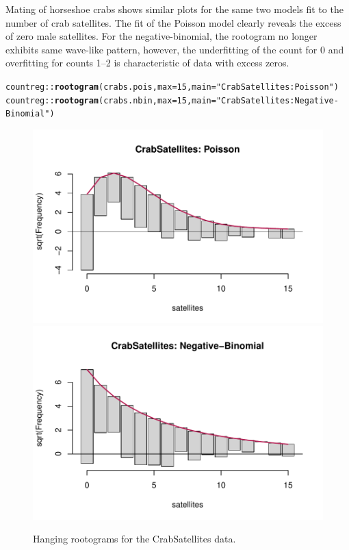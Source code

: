 \documentclass[11pt]{book}\usepackage[]{graphicx}\usepackage[]{color}
\makeatletter
\newcommand{\hlnum}[1]{\textcolor[rgb]{0.686,0.059,0.569}{#1}}%
\newcommand{\hlstr}[1]{\textcolor[rgb]{0.192,0.494,0.8}{#1}}%
\newcommand{\hlstd}[1]{\textcolor[rgb]{0.345,0.345,0.345}{#1}}%
\newcommand{\hlkwc}[1]{\textcolor[rgb]{0.333,0.667,0.333}{#1}}%
\newcommand{\hlkwd}[1]{\textcolor[rgb]{0.737,0.353,0.396}{\textbf{#1}}}%
\newenvironment{kframe}{%
 \def\at@end@of@kframe{}%
 \ifinner\ifhmode%
  \def\at@end@of@kframe{\end{minipage}}%
  \begin{minipage}{\columnwidth}%
 \fi\fi%
 \def\FrameCommand##1{\hskip\@totalleftmargin \hskip-\fboxsep
 \colorbox{shadecolor}{##1}\hskip-\fboxsep
     \hskip-\linewidth \hskip-\@totalleftmargin \hskip\columnwidth}%
 \MakeFramed {\advance\hsize-\width
   \@totalleftmargin\z@ \linewidth\hsize
   \@setminipage}}%
 {\par\unskip\endMakeFramed%
 \at@end@of@kframe}
\newenvironment{knitrout}{}{} %
\renewenvironment{knitrout}{\small\renewcommand{\baselinestretch}{.85}}{} %
\makeatother
\begin{document}
\begin{Example}[crabs2]{Mating of horseshoe crabs}
 shows similar plots for the same two models fit to the number of
crab satellites.  The fit of the Poisson model clearly reveals the excess of zero male satellites.
For the negative-binomial, the rootogram no longer exhibits same wave-like pattern,
however, the underfitting of the count for 0 and overfitting for counts 1--2 is
characteristic of data with excess zeros.

\begin{knitrout}
\color{fgcolor}\begin{kframe}
\begin{alltt}
\hlstd{countreg::}\hlkwd{rootogram}\hlstd{(crabs.pois,} \hlkwc{max}\hlstd{=}\hlnum{15}\hlstd{,} \hlkwc{main}\hlstd{=}\hlstr{"CrabSatellites: Poisson"}\hlstd{)}
\hlstd{countreg::}\hlkwd{rootogram}\hlstd{(crabs.nbin,} \hlkwc{max}\hlstd{=}\hlnum{15}\hlstd{,} \hlkwc{main}\hlstd{=}\hlstr{"CrabSatellites: Negative-Binomial"}\hlstd{)}
\end{alltt}
\end{kframe}\begin{figure}[!htbp]


\centerline{\includegraphics[width=.49\textwidth]{ch09/fig/crabs2-rootogram-1} 
\includegraphics[width=.49\textwidth]{ch09/fig/crabs2-rootogram-2} }

\caption[Hanging rootograms for the CrabSatellites data]{Hanging rootograms for the CrabSatellites data.\label{fig:crabs2-rootogram}}
\end{figure}


\end{knitrout}
\end{Example}
\end{document}
